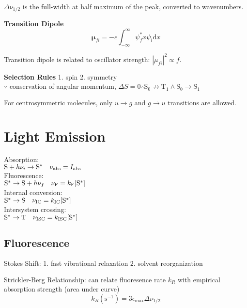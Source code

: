 $\Delta \nu_{1/2}$ is the full-width at half maximum of the peak, converted to wavenumbers.
\vspace{\baselineskip}

\textbf{Transition Dipole}
\begin{equation*}
  \mathbf{\mu}_{fi} = -e \int_{-\infty}^{\infty}\psi^{*}_{f} x \psi_{i} \mathrm{d}x
\end{equation*}

Transition dipole is related to oscillator strength: $|\mu_{fi}|^2 \propto f$.
\vspace{\baselineskip}

\textbf{Selection Rules} 1. spin 2. symmetry \\
$\because$ conservation of angular momentum, $\Delta S =0 \therefore \mathrm{S_0} \not\rightarrow \mathrm{T_1} \wedge \mathrm{S_0} \rightarrow \mathrm{S_1}$

For centrosymmetric molecules, only $u \rightarrow g$ and  $g \rightarrow u$ transitions are allowed.
\vspace{\baselineskip}
\section{Light Emission}

Absorption:\\ $\ce{S} + h\nu_i \rightarrow \ce{S}^{*}\quad \nu_{\mathrm{abs}} = I_{\mathrm{abs}}$\\
Fluorescence:\\ $\ce{S}^{*} \rightarrow \ce{S} + h\nu_f \quad \nu_{\mathrm{F}} = k_{\mathrm{F}} [\ce{S}^{*}]$ \\
Internal conversion:\\ $\ce{S}^{*} \rightarrow \ce{S} \quad \nu_{\mathrm{IC}} = k_{\mathrm{IC}}[\ce{S}^{*}]$ \\
Intersystem crossing:\\ $\ce{S}^{*} \rightarrow \ce{T} \quad \nu_{\mathrm{ISC}} = k_{\mathrm{ISC}}[\ce{S}^{*}]$ \\

\subsection*{Fluorescence}
Stokes Shift:
1. fast vibrational relaxation 2. solvent reorganization
\vspace{\baselineskip}

Strickler-Berg Relationship: can relate fluoresence rate $k_R$ with empirical absorption strength (area under curve)
$$ k_R (\mathrm{s}^{-1})= 3 \epsilon_{\mathrm{max}} \Delta \nu_{1/2}$$


